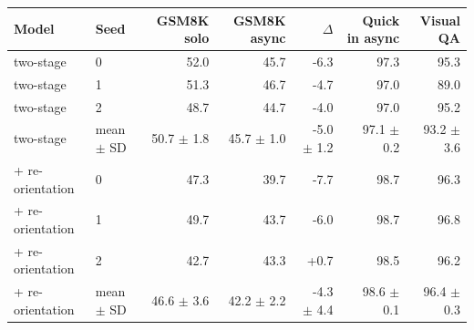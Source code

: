 \begin{tabular}{llrrrrr}
\toprule
Model & Seed & GSM8K solo & GSM8K async & $\Delta$ & Quick in async & Visual QA \\
\midrule
two-stage & 0 & 52.0 & 45.7 & -6.3 & 97.3 & 95.3 \\
two-stage & 1 & 51.3 & 46.7 & -4.7 & 97.0 & 89.0 \\
two-stage & 2 & 48.7 & 44.7 & -4.0 & 97.0 & 95.2 \\
two-stage & mean $\pm$ SD & 50.7 $\pm$ 1.8 & 45.7 $\pm$ 1.0 & -5.0 $\pm$ 1.2 & 97.1 $\pm$ 0.2 & 93.2 $\pm$ 3.6 \\
\midrule
+ re-orientation & 0 & 47.3 & 39.7 & -7.7 & 98.7 & 96.3 \\
+ re-orientation & 1 & 49.7 & 43.7 & -6.0 & 98.7 & 96.8 \\
+ re-orientation & 2 & 42.7 & 43.3 & +0.7 & 98.5 & 96.2 \\
+ re-orientation & mean $\pm$ SD & 46.6 $\pm$ 3.6 & 42.2 $\pm$ 2.2 & -4.3 $\pm$ 4.4 & 98.6 $\pm$ 0.1 & 96.4 $\pm$ 0.3 \\
\bottomrule
\end{tabular}
